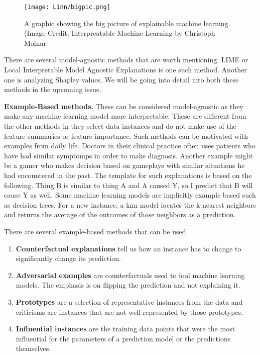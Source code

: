 \documentclass{../template/texnote}
\begin{document}
\begin{figure}[htpb]
    \centering
    \texttt{[image: Linn/bigpic.png]}
    \caption{A graphic showing the big picture of explainable machine learning. (Image Credit: Interpreatable Machine Learning by Christoph Molnar}
    \label{fig:bigpic}
\end{figure}



There are several model-agnostic methods that are worth mentioning. 
LIME or Local Interpretable Model Agnostic Explanations \cite{doshi-velez_towards_2017} is one such method. 
Another one is analyzing Shapley values.
We will be going into detail into both these methods in the upcoming issue.

\textbf{Example-Based methods.} These can be considered model-agnostic as they make any machine learning model more interpretable. 
These are different from the other methods in they select data instances and do not make use of the feature summaries or feature importance.
Such methods can be motivated with examples from daily life. 
Doctors in their clinical practice often uses patients who have had similar symptomps in order to make diagnosis.
Another example might be a gamer who makes decision based on gameplays with similar situations he had encountered in the past.
The template for such explanations is based on the following.
Thing B is similar to thing A and A caused Y, so I predict that B will cause Y as well.
Some machine learning models are implicitly example based such as decision trees. 
For a new instance, a knn model locates the k-nearest neighbors and returns the average of the outcomes of those neighbors as a prediction.

There are several example-based methods that can be used.
\begin{enumerate}
\item \textbf{Counterfactual explanations} tell us how an instance has to change to significantly change its prediction.
\item \textbf{Adversarial examples} are counterfactuals used to fool machine learning models. The emphasis is on flipping the prediction and not explaining it.
\item \textbf{Prototypes} are a selection of representative instances from the data and criticisms are instances that are not well represented by those prototypes.
\item \textbf{Influential instances} are the training data points that were the most influential for the parameters of a prediction model or the predictions themselves.
\end{enumerate}
\end{document}
